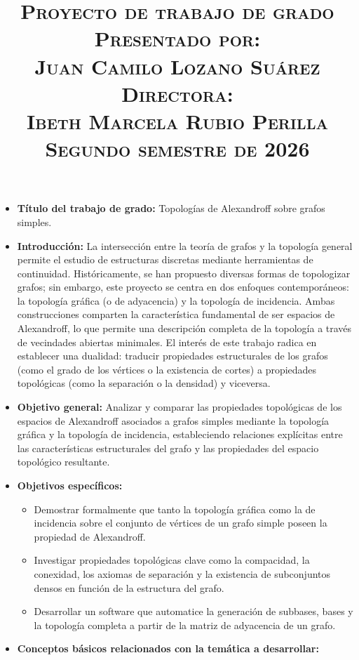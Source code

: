 \documentclass{article}
\title{
  \vspace{-1.5cm}
  \textsc{
    \LARGE{Proyecto de trabajo de grado\\ \vspace{1cm}}
    \large{ {Presentado por:} \\ \vspace{0.3cm} {Juan Camilo Lozano Suárez} \\ \vspace{1cm} {Directora:} \\ \vspace{0.3cm} {Ibeth Marcela Rubio Perilla \\ \vspace{1cm} Segundo semestre de 2026}}\\
  }
}
\date{}
\begin{document}
    
    \maketitle
    \begin{itemize}
       \item \textbf{Título del trabajo de grado:} Topologías de Alexandroff sobre grafos simples.
       \item \textbf{Introducción:} La intersección entre la teoría de grafos y la topología general permite el estudio de estructuras discretas mediante herramientas de continuidad. Históricamente, se han propuesto diversas formas de topologizar grafos; sin embargo, este proyecto se centra en dos enfoques contemporáneos: la topología gráfica (o de adyacencia) y la topología de incidencia. Ambas construcciones comparten la característica fundamental de ser espacios de Alexandroff, lo que permite una descripción completa de la topología a través de vecindades abiertas minimales. El interés de este trabajo radica en establecer una dualidad: traducir propiedades estructurales de los grafos (como el grado de los vértices o la existencia de cortes) a propiedades topológicas (como la separación o la densidad) y viceversa.
       \item \textbf{Objetivo general:} Analizar y comparar las propiedades topológicas de los espacios de Alexandroff asociados a grafos simples mediante la topología gráfica y la topología de incidencia, estableciendo relaciones explícitas entre las características estructurales del grafo y las propiedades del espacio topológico resultante.
       \item \textbf{Objetivos específicos:}
          \begin{itemize}
             \item Demostrar formalmente que tanto la topología gráfica como la de incidencia sobre el conjunto de vértices de un grafo simple poseen la propiedad de Alexandroff.
             \item Investigar propiedades topológicas clave como la compacidad, la conexidad, los axiomas de separación y la existencia de subconjuntos densos en función de la estructura del grafo.
             \item Desarrollar un software que automatice la generación de subbases, bases y la topología completa a partir de la matriz de adyacencia de un grafo.
          \end{itemize}
       \item \textbf{Conceptos básicos relacionados con la temática a desarrollar:}

\end{itemize}
\end{document}
